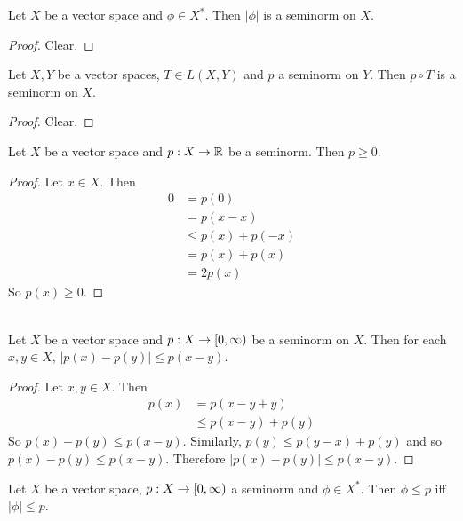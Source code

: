 \documentclass{book}
\begin{document}
	\begin{ex}
		Let $X$ be a vector space and $\phi \in X^*$. Then $|\phi|$ is a seminorm on $X$.
	\end{ex}
	
	\begin{proof}
		Clear.
	\end{proof}

	\begin{ex}
		Let $X,Y$ be a vector spaces, $T \in L(X, Y)$ and $p$ a seminorm on $Y$. Then $p \circ T$ is a seminorm on $X$.
	\end{ex}
	
	\begin{proof}
		Clear.
	\end{proof}
	
	\begin{ex} 
		Let $X$ be a vector space and $p: X \rightarrow \mathbb{R}$ be a seminorm. Then $p \geq 0$. 
	\end{ex}
	
	\begin{proof}
		Let $x \in X$. Then 
		\begin{align*}
			0 
			&= p(0) \\ 
			&= p(x - x) \\
			&\leq  p(x) + p(-x) \\
			&= p(x) + p(x) \\
			&= 2p(x)
		\end{align*}
		So $p(x) \geq 0$.
	\end{proof}

	\begin{ex}  \\
		Let $X$ be a vector space and $p:X \rightarrow [0,\infty)$ be a seminorm on $X$. Then for each $x ,y \in X$, $|p(x) - p(y)| \leq p(x - y)$.  
	\end{ex}
	
	\begin{proof}
		Let $x, y \in X$. Then 
		\begin{align*}
			p(x)
			&= p(x -y + y) \\
			&\leq p(x - y) + p(y) 
		\end{align*}
		So $p(x) - p(y) \leq p(x - y)$. 
		Similarly, $p(y) \leq p(y - x) + p(y)$ and so $p(x) - p(y) \leq p(x - y)$. Therefore $|p(x) - p(y)| \leq p(x - y)$.
	\end{proof}
	
	\begin{ex}
		Let $X$ be a vector space, $p: X \rightarrow [0,\infty)$ a seminorm and $\phi \in X^*$. Then $\phi \leq p$ iff $|\phi| \leq p$. 
	\end{ex}
	
\end{document}
